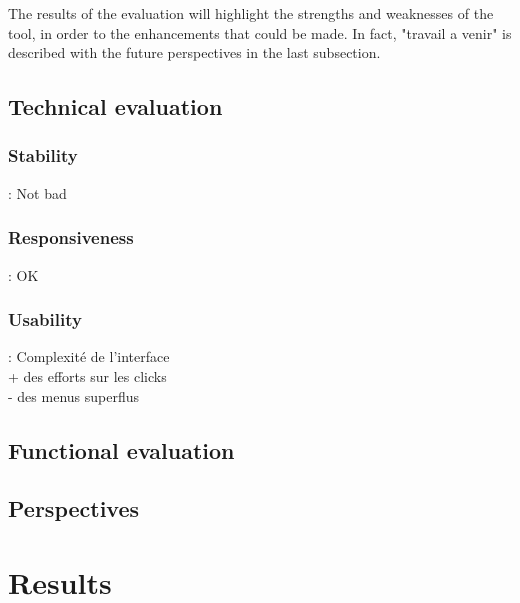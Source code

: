 The results of the evaluation will highlight the strengths and weaknesses of the tool, in order to %
the enhancements that could be made. In fact, "travail a venir" is described with the future perspectives in the last subsection.


\subsection{Technical evaluation}
\subsubsection{Stability} 
: Not bad
\subsubsection{Responsiveness} 
: %
OK
\subsubsection{Usability} 
: Complexité de l'interface\\

+ des efforts sur les clicks\\
- des menus superflus

\subsection{Functional evaluation}


\subsection{Perspectives}


\section{Results}


